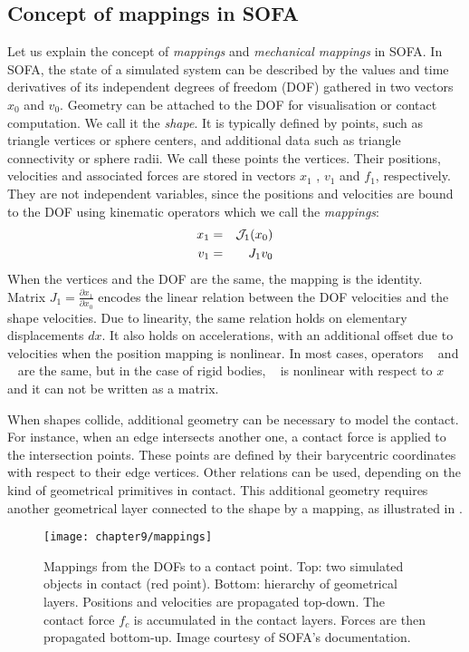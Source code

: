 	\subsection{Concept of mappings in SOFA}	\label{chap9:mappings}
Let us explain the concept of \emph{mappings} and \emph{mechanical mappings} in SOFA. In SOFA, the state of a simulated system can be described by the values and time derivatives of its independent degrees of freedom (DOF) gathered in two vectors $x_0$ and $v_0$. Geometry can be attached to the DOF for visualisation or contact computation. We call it the \emph{shape}. It is typically defined by points, such as triangle vertices or sphere centers, and additional data such as triangle connectivity or sphere radii. We call these points the vertices. Their positions, velocities and associated forces are stored in vectors $x_1$ , $v_1$ and $f_1$, respectively. They are not independent variables, since the positions and velocities are bound to the DOF using kinematic operators which we call the \emph{mappings}:
\begin{eqnarray*}
x_1 &=&\mathcal{J}_1(x_0)\\ 
v_1 &=& J_1 v_0
\end{eqnarray*}
When the vertices and the DOF are the same, the mapping is the identity. Matrix $J_1 = \frac{\partial x_1}{\partial x_0}$ encodes the linear relation between the DOF velocities and the shape velocities. Due to linearity, the same relation holds on elementary displacements $dx$. It also holds on accelerations, with an additional offset due to velocities when the position mapping \JNL is nonlinear. In most cases, operators \JNL~ and \J~ are the same, but in the case of rigid bodies, \JNL~ is nonlinear with respect to $x$ and it can not be written as a matrix.

When shapes collide, additional geometry can be necessary to model the contact. For instance, when an edge intersects another one, a contact force is applied to the intersection points. These points are defined by their barycentric coordinates with respect to their edge vertices. Other relations can be used, depending on the kind of geometrical primitives in contact. This additional geometry requires another geometrical layer connected to the shape by a mapping, as illustrated in .

\begin{figure}[ht]
	\begin{center}
 		\texttt{[image: chapter9/mappings]}
 	\end{center}
 \caption[Concept of mappings in SOFA]{Mappings from the DOFs to a contact point. Top: two simulated objects in contact (red point). Bottom: hierarchy of geometrical layers. Positions and velocities are propagated top-down. The contact force $f_c$ is accumulated in the contact layers. Forces are then propagated bottom-up. Image courtesy of SOFA's documentation. }
\label{chap9:fig-mappings}
\end{figure}

